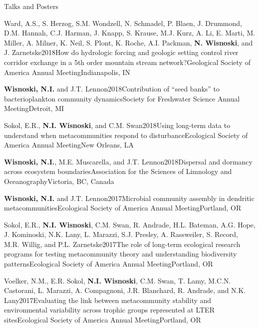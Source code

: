 \documentclass{resume} %
\begin{document}
\begin{rhangSection}{Talks and Posters}
  \begin{Presentation}{Ward, A.S., S. Herzog, S.M. Wondzell, N. Schmadel, P. Blaen, J. Drummond, D.M. Hannah, C.J. Harman, J. Knapp, S. Krause, M.J. Kurz, A. Li, E. Marti, M. Miller, A. Milner, K. Neil, S. Plont, K. Roche, A.I. Packman, {\bf N. Wisnoski}, and J. Zarnetske}{2018}{How do hydrologic forcing and geologic setting control river corridor exchange in a 5th order mountain stream network?}{Geological Society of America Annual Meeting}{Indianapolis, IN}
  \end{Presentation}
  
  \begin{Presentation}{{\bf Wisnoski, N.I.} and J.T. Lennon}{2018}{Contribution of \enquote{seed banks} to bacterioplankton community dynamics}{Society for Freshwater Science Annual Meeting}{Detroit, MI}
  \end{Presentation}
  
  \begin{Presentation}{Sokol, E.R., {\bf N.I. Wisnoski}, and C.M. Swan}{2018}{Using long-term data to understand when metacommunities respond to disturbance}{Ecological Society of America Annual Meeting}{New Orleans, LA}
  \end{Presentation}

  \begin{Presentation}{{\bf Wisnoski, N.I.}, M.E. Muscarella, and J.T. Lennon}{2018}{Dispersal and dormancy across ecosystem boundaries}{Association for the Sciences of Limnology and Oceanography}{Victoria, BC, Canada}
  \end{Presentation}

  \begin{Presentation}{{\bf Wisnoski, N.I.} and J.T. Lennon}{2017}{Microbial community assembly in dendritic metacommunities}{Ecological Society of America Annual Meeting}{Portland, OR}
  \end{Presentation}
  
  \begin{Presentation}{Sokol, E.R., {\bf N.I. Wisnoski}, C.M. Swan, R. Andrade, H.L. Bateman, A.G. Hope, J. Kominoski, N.K. Lany, L. Marazzi, S.J. Presley, A. Rassweiler, S. Record, M.R. Willig, and P.L. Zarnetske}{2017}{The role of long-term ecological research programs for testing metacommunity theory and understanding biodiversity patterns}{Ecological Society of America Annual Meeting}{Portland, OR}
  \end{Presentation}
  
  \begin{Presentation}{Voelker, N.M., E.R. Sokol, {\bf N.I. Wisnoski}, C.M. Swan, T. Lamy, M.C.N. Castorani, L. Marazzi, A. Compagnoni, J.R. Blanchard, R. Andrade, and N.K. Lany}{2017}{Evaluating the link between metacommunity stability and environmental variability across trophic groups represented at LTER sites}{Ecological Society of America Annual Meeting}{Portland, OR}
  \end{Presentation}


\end{rhangSection}
\end{document}
